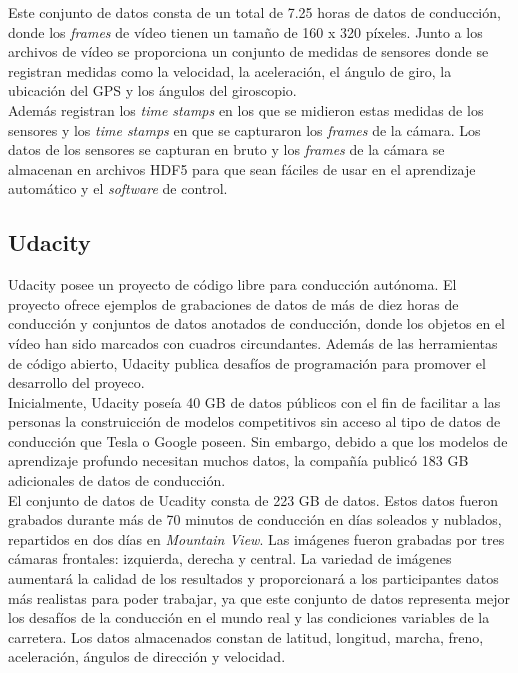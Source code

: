 Este conjunto de datos consta de un total de 7.25 horas de datos de conducción, donde los \textit{frames} de vídeo tienen un tamaño de 160 x 320 píxeles. Junto a los archivos de vídeo se proporciona un conjunto de medidas de sensores donde se registran medidas como la velocidad, la aceleración, el ángulo de giro, la ubicación del GPS y los ángulos del giroscopio.\\

Además registran los \textit{time  stamps} en los que se midieron estas medidas de los sensores y los \textit{time  stamps} en que se capturaron los \textit{frames} de la cámara. Los datos de los sensores se capturan en bruto y los \textit{frames} de la cámara se almacenan en archivos HDF5 para que sean fáciles de usar en el aprendizaje automático y el \textit{software} de control.

\subsection{Udacity}

Udacity posee un proyecto de código libre para conducción autónoma. El proyecto ofrece ejemplos de grabaciones de datos de más de diez horas de conducción y conjuntos de datos anotados de conducción, donde los objetos en el vídeo han sido marcados con cuadros circundantes. Además de las herramientas de código abierto, Udacity publica desafíos de programación para promover el desarrollo del proyeco. \\

Inicialmente, Udacity \cite{udacity-data} poseía 40 GB de datos públicos con el fin de facilitar a las personas la construicción de modelos competitivos sin acceso al tipo de datos de conducción que Tesla o Google poseen. Sin embargo, debido a que los modelos de aprendizaje profundo necesitan muchos datos, la compañía publicó 183 GB adicionales de datos de conducción.\\

El conjunto de datos de Ucadity \cite{udacity-dataset} consta de 223 GB de datos. Estos datos fueron grabados durante más de 70 minutos de conducción en días soleados y nublados, repartidos en dos días en \textit{Mountain View}. Las imágenes fueron grabadas por tres cámaras frontales: izquierda, derecha y central. La variedad de imágenes aumentará la calidad de los resultados y proporcionará a los participantes datos más realistas para poder trabajar, ya que este conjunto de datos representa mejor los desafíos de la conducción en el mundo real y las condiciones variables de la carretera. Los datos almacenados constan de latitud, longitud, marcha, freno, aceleración, ángulos de dirección y velocidad.


